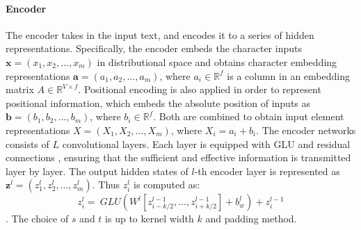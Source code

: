 \paragraph{Encoder}
The encoder takes in the input text, and encodes it to a series of hidden 
representations.
Specifically, the encoder embeds the character inputs 
$\textbf{x} = (x_{1},x_{2},...,x_{m})$ in distributional space
and obtains character embedding representations $\textbf{a} = (a_1, a_2, ..., a_m)$, 
where $a_i \in \mathbb{R}^f$ is a column in
an embedding matrix $A \in \mathbb{R}^{V\times f}$.
Positional encoding is also applied in order to represent positional information,
which embeds the absolute position of inputs as $\textbf{b} = (b_1, b_2, ..., b_m)$,
where $b_i \in \mathbb{ R }^f$.
Both are combined to obtain input element representations $X = 
(X_1, X_2, ..., X_m)$, where $X_i = a_i+b_i$.
The encoder networks consists of $L$ convolutional layers.
Each layer is equipped with GLU \cite{DauphinFAG17} and residual connections \cite{HeZRS16},
ensuring that the sufficient and effective information is transmitted layer by layer.  
The output hidden states of $l$-th encoder layer is represented as 
$\textbf{z}^l = (z^l_1, z^l_2, ..., z^l_m)$.
Thus $z^l_i$ is computed as:
\begin{equation}
z _ { i } ^ { l } = ~ GLU \left( W ^ { l } \left[ z _ {i-k/2 } ^ { l - 1 } , \ldots , z _ { i+k/2 } ^ { l - 1 } \right] + b _ { w } ^ { l } \right)  + z _ { i } ^ { l - 1 }
\end{equation}
.
The choice of $s$ and $t$ is up to kernel width $k$ and padding method.


